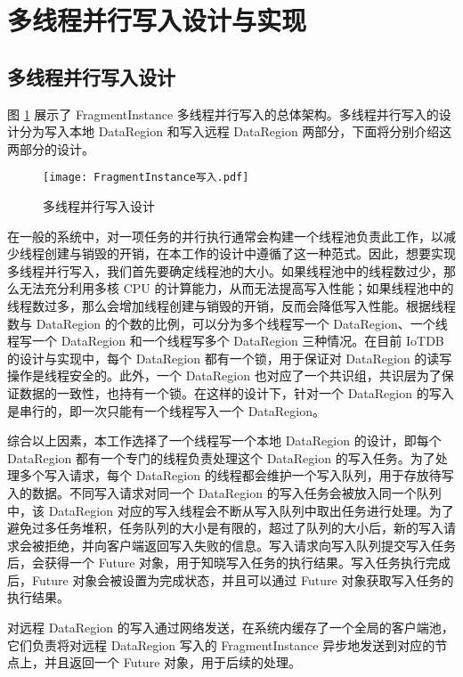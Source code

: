 \section{多线程并行写入设计与实现}
\subsection{多线程并行写入设计}
图 \ref{fig:fi-parallel-write} 展示了 FragmentInstance 多线程并行写入的总体架构。多线程并行写入的设计分为写入本地 DataRegion 和写入远程 DataRegion 两部分，下面将分别介绍这两部分的设计。

\begin{figure}
  \centering
  \texttt{[image: FragmentInstance写入.pdf]}
  \caption{多线程并行写入设计}
  \label{fig:fi-parallel-write}
\end{figure}

在一般的系统中，对一项任务的并行执行通常会构建一个线程池负责此工作，以减少线程创建与销毁的开销，在本工作的设计中遵循了这一种范式。因此，想要实现多线程并行写入，我们首先要确定线程池的大小。如果线程池中的线程数过少，那么无法充分利用多核 CPU 的计算能力，从而无法提高写入性能；如果线程池中的线程数过多，那么会增加线程创建与销毁的开销，反而会降低写入性能。根据线程数与 DataRegion 的个数的比例，可以分为多个线程写一个 DataRegion、一个线程写一个 DataRegion 和一个线程写多个 DataRegion 三种情况。在目前 IoTDB 的设计与实现中，每个 DataRegion 都有一个锁，用于保证对 DataRegion 的读写操作是线程安全的。此外，一个 DataRegion 也对应了一个共识组，共识层为了保证数据的一致性，也持有一个锁。在这样的设计下，针对一个 DataRegion 的写入是串行的，即一次只能有一个线程写入一个 DataRegion。

综合以上因素，本工作选择了一个线程写一个本地 DataRegion 的设计，即每个 DataRegion 都有一个专门的线程负责处理这个 DataRegion 的写入任务。为了处理多个写入请求，每个 DataRegion 的线程都会维护一个写入队列，用于存放待写入的数据。不同写入请求对同一个 DataRegion 的写入任务会被放入同一个队列中，该 DataRegion 对应的写入线程会不断从写入队列中取出任务进行处理。为了避免过多任务堆积，任务队列的大小是有限的，超过了队列的大小后，新的写入请求会被拒绝，并向客户端返回写入失败的信息。写入请求向写入队列提交写入任务后，会获得一个 Future 对象，用于知晓写入任务的执行结果。写入任务执行完成后，Future 对象会被设置为完成状态，并且可以通过 Future 对象获取写入任务的执行结果。

对远程 DataRegion 的写入通过网络发送，在系统内缓存了一个全局的客户端池，它们负责将对远程 DataRegion 写入的 FragmentInstance 异步地发送到对应的节点上，并且返回一个 Future 对象，用于后续的处理。

